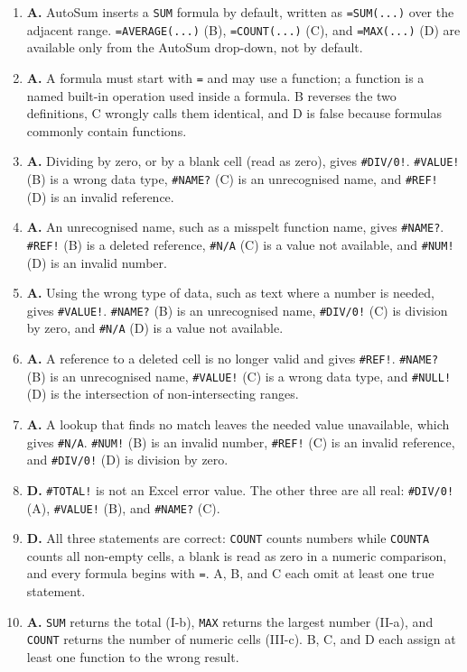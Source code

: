 \begin{enumerate}[label=\textbf{Q\arabic*.}, leftmargin=*]
  (B) is not the AutoSum shortcut, \texttt{Shift + F3} (C) opens the Insert
  Function dialog, and \texttt{Ctrl + S} (D) saves the workbook.
\item \textbf{A.} AutoSum inserts a \texttt{SUM} formula by default, written
  as \texttt{=SUM(...)} over the adjacent range. \texttt{=AVERAGE(...)} (B),
  \texttt{=COUNT(...)} (C), and \texttt{=MAX(...)} (D) are available only from
  the AutoSum drop-down, not by default.
\item \textbf{A.} A formula must start with \texttt{=} and may use a function;
  a function is a named built-in operation used inside a formula. B reverses
  the two definitions, C wrongly calls them identical, and D is false because
  formulas commonly contain functions.
\item \textbf{A.} Dividing by zero, or by a blank cell (read as zero), gives
  \texttt{\#DIV/0!}. \texttt{\#VALUE!} (B) is a wrong data type,
  \texttt{\#NAME?} (C) is an unrecognised name, and \texttt{\#REF!} (D) is an
  invalid reference.
\item \textbf{A.} An unrecognised name, such as a misspelt function name,
  gives \texttt{\#NAME?}. \texttt{\#REF!} (B) is a deleted reference,
  \texttt{\#N/A} (C) is a value not available, and \texttt{\#NUM!} (D) is an
  invalid number.
\item \textbf{A.} Using the wrong type of data, such as text where a number is
  needed, gives \texttt{\#VALUE!}. \texttt{\#NAME?} (B) is an unrecognised
  name, \texttt{\#DIV/0!} (C) is division by zero, and \texttt{\#N/A} (D) is a
  value not available.
\item \textbf{A.} A reference to a deleted cell is no longer valid and gives
  \texttt{\#REF!}. \texttt{\#NAME?} (B) is an unrecognised name,
  \texttt{\#VALUE!} (C) is a wrong data type, and \texttt{\#NULL!} (D) is the
  intersection of non-intersecting ranges.
\item \textbf{A.} A lookup that finds no match leaves the needed value
  unavailable, which gives \texttt{\#N/A}. \texttt{\#NUM!} (B) is an invalid
  number, \texttt{\#REF!} (C) is an invalid reference, and \texttt{\#DIV/0!}
  (D) is division by zero.
\item \textbf{D.} \texttt{\#TOTAL!} is not an Excel error value. The other
  three are all real: \texttt{\#DIV/0!} (A), \texttt{\#VALUE!} (B), and
  \texttt{\#NAME?} (C).
\item \textbf{D.} All three statements are correct: \texttt{COUNT} counts
  numbers while \texttt{COUNTA} counts all non-empty cells, a blank is read as
  zero in a numeric comparison, and every formula begins with \texttt{=}. A,
  B, and C each omit at least one true statement.
\item \textbf{A.} \texttt{SUM} returns the total (I-b), \texttt{MAX} returns
  the largest number (II-a), and \texttt{COUNT} returns the number of numeric
  cells (III-c). B, C, and D each assign at least one function to the wrong
  result.


\end{enumerate}
